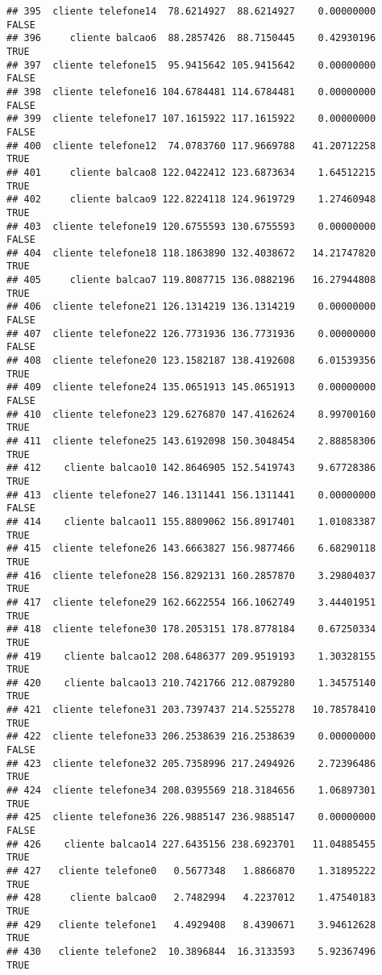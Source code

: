 \documentclass[
]{article}
\begin{document}
\begin{verbatim}
## 395  cliente telefone14  78.6214927  88.6214927    0.00000000    FALSE
## 396     cliente balcao6  88.2857426  88.7150445    0.42930196     TRUE
## 397  cliente telefone15  95.9415642 105.9415642    0.00000000    FALSE
## 398  cliente telefone16 104.6784481 114.6784481    0.00000000    FALSE
## 399  cliente telefone17 107.1615922 117.1615922    0.00000000    FALSE
## 400  cliente telefone12  74.0783760 117.9669788   41.20712258     TRUE
## 401     cliente balcao8 122.0422412 123.6873634    1.64512215     TRUE
## 402     cliente balcao9 122.8224118 124.9619729    1.27460948     TRUE
## 403  cliente telefone19 120.6755593 130.6755593    0.00000000    FALSE
## 404  cliente telefone18 118.1863890 132.4038672   14.21747820     TRUE
## 405     cliente balcao7 119.8087715 136.0882196   16.27944808     TRUE
## 406  cliente telefone21 126.1314219 136.1314219    0.00000000    FALSE
## 407  cliente telefone22 126.7731936 136.7731936    0.00000000    FALSE
## 408  cliente telefone20 123.1582187 138.4192608    6.01539356     TRUE
## 409  cliente telefone24 135.0651913 145.0651913    0.00000000    FALSE
## 410  cliente telefone23 129.6276870 147.4162624    8.99700160     TRUE
## 411  cliente telefone25 143.6192098 150.3048454    2.88858306     TRUE
## 412    cliente balcao10 142.8646905 152.5419743    9.67728386     TRUE
## 413  cliente telefone27 146.1311441 156.1311441    0.00000000    FALSE
## 414    cliente balcao11 155.8809062 156.8917401    1.01083387     TRUE
## 415  cliente telefone26 143.6663827 156.9877466    6.68290118     TRUE
## 416  cliente telefone28 156.8292131 160.2857870    3.29804037     TRUE
## 417  cliente telefone29 162.6622554 166.1062749    3.44401951     TRUE
## 418  cliente telefone30 178.2053151 178.8778184    0.67250334     TRUE
## 419    cliente balcao12 208.6486377 209.9519193    1.30328155     TRUE
## 420    cliente balcao13 210.7421766 212.0879280    1.34575140     TRUE
## 421  cliente telefone31 203.7397437 214.5255278   10.78578410     TRUE
## 422  cliente telefone33 206.2538639 216.2538639    0.00000000    FALSE
## 423  cliente telefone32 205.7358996 217.2494926    2.72396486     TRUE
## 424  cliente telefone34 208.0395569 218.3184656    1.06897301     TRUE
## 425  cliente telefone36 226.9885147 236.9885147    0.00000000    FALSE
## 426    cliente balcao14 227.6435156 238.6923701   11.04885455     TRUE
## 427   cliente telefone0   0.5677348   1.8866870    1.31895222     TRUE
## 428     cliente balcao0   2.7482994   4.2237012    1.47540183     TRUE
## 429   cliente telefone1   4.4929408   8.4390671    3.94612628     TRUE
## 430   cliente telefone2  10.3896844  16.3133593    5.92367496     TRUE

\end{verbatim}
\end{document}
